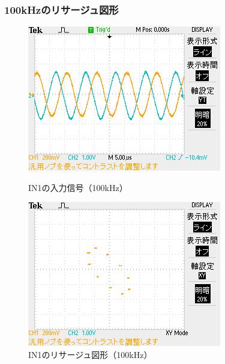 \documentclass{jlreq}
\numberwithin{equation}{section}
\begin{document}
\subsubsection{100kHzのリサージュ図形}
\begin{figure}[H]
  \centering
  \begin{minipage}{0.45\textwidth}
    \centering
    \includegraphics[width=\textwidth, keepaspectratio]{IN1_100kHz_YT.png}
    \caption{IN1の入力信号（100kHz）}
  \end{minipage}
  \hfill
  \begin{minipage}{0.45\textwidth}
    \centering
    \includegraphics[width=\textwidth, keepaspectratio]{IN1_100kHz_XY.png}
    \caption{IN1のリサージュ図形（100kHz）}
  \end{minipage}
\end{figure}
\end{document}
